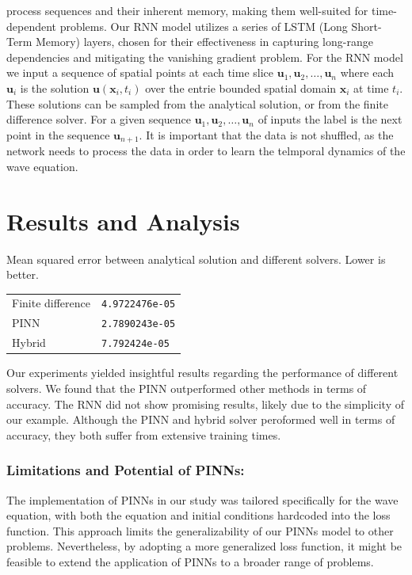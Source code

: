 \documentclass[twoside,11pt]{report}
\begin{document}
    process sequences and their inherent memory, making them well-suited for time-dependent problems.
    Our RNN model utilizes a series of LSTM (Long Short-Term Memory)\cite{lstm} layers, chosen for their 
    effectiveness in capturing long-range dependencies and mitigating the vanishing gradient problem.
    For the RNN model we input a sequence of spatial points at each time slice 
    $\mathbf{u}_1, \mathbf{u}_2, \dots, \mathbf{u}_n$ where each $\mathbf{u}_i$ is 
    the solution $\mathbf{u}(\mathbf{x}_i,t_i)$
    over the entrie bounded spatial domain $\mathbf{x}_i$ at time $t_i$. These solutions can be sampled from the analytical
    solution, or from the finite difference solver.
    For a given sequence $\mathbf{u}_1, \mathbf{u}_2, \dots, \mathbf{u}_n$ of inputs the 
    label is the next point in the sequence
    $\mathbf{u}_{n+1}$.
    It is important that the data is not shuffled, as the network needs to process the data in order to learn the
    telmporal dynamics of the wave equation.
        \cite{hu2022neuralpde}



\section{Results and Analysis}
\label{sec:resultsdiscussion}

    \begin{mytable}[float=!h,label=tab:toyscores, width=0.5\textwidth]{Mean squared error between 
        analytical solution and different solvers. Lower is better.}
    \centering
    \begin{tabular}{l|l}
        Finite difference   &\texttt{4.9722476e-05}  \\
        PINN                &\texttt{2.7890243e-05}  \\
        Hybrid              &\texttt{7.792424e-05}  \\
    \end{tabular}%
    \end{mytable}
    
    Our experiments yielded insightful results regarding the performance of different solvers. 
    We found that the PINN outperformed other methods in terms of accuracy. The RNN did 
    not show promising results, likely due to the simplicity of our example.
    Although the PINN and hybrid solver peroformed well in terms of accuracy, they both suffer from extensive
    training times.
    \subsubsection{Limitations and Potential of PINNs:}
    The implementation of PINNs in our study was tailored specifically for the wave equation, with both the 
    equation and initial conditions hardcoded into the loss function. This approach limits the generalizability 
    of our PINNs model to other problems. Nevertheless, by adopting a more generalized loss function, it might 
    be feasible to extend the application of PINNs to a broader range of problems.
\end{document}

